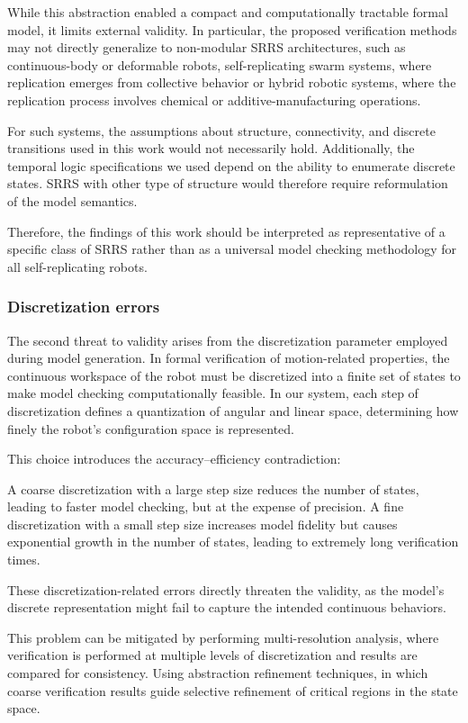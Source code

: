 While this abstraction enabled a compact and computationally tractable formal 
model, it  limits external validity. 
In particular, the proposed verification methods may not directly generalize to
non-modular SRRS architectures, such as continuous-body or deformable robots,
self-replicating swarm systems, where replication emerges from collective behavior or
 hybrid robotic systems, where the replication process 
involves chemical or additive-manufacturing operations.

For such systems, the assumptions about structure, connectivity, and 
discrete transitions used in this work would not necessarily hold. 
Additionally, the temporal logic specifications we used depend on the ability to 
enumerate discrete states.  SRRS with other type of structure 
 would therefore require reformulation of the model semantics. 

Therefore, the findings of this work should be interpreted as representative 
of a specific class of SRRS rather than as a universal model checking methodology 
for all self-replicating robots.

\subsubsection{ Discretization errors}

The second threat to validity arises from the discretization parameter 
employed during model generation. In formal verification of  
motion-related properties, the continuous workspace of the robot must 
be discretized into a finite set of states to make model checking computationally 
feasible. 
In our system, each step of discretization defines a quantization 
of angular  and  linear space,  determining how finely 
the robot's configuration space is represented.

This choice introduces the  accuracy–efficiency contradiction:     

A coarse discretization with a large step size reduces the number of 
states, leading to faster model checking, but at the expense of precision. 
A fine discretization with a small step size increases model 
fidelity but causes exponential growth in the number of states, leading 
to  extremely long verification times. 

These discretization-related errors directly threaten the validity,
as the model's discrete representation might fail to capture the intended 
continuous behaviors. 

This problem can be mitigated by performing  multi-resolution analysis, 
where verification is performed at multiple levels of discretization and 
results are compared for consistency.
Using abstraction refinement techniques, in which coarse verification results 
guide selective refinement of critical regions in the state space.

